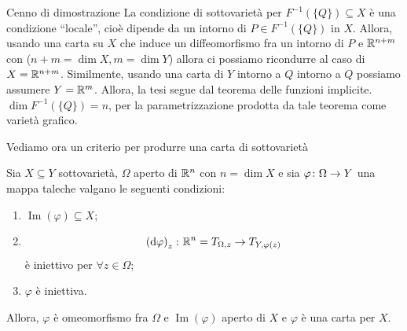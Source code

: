\documentclass[a4paper]{article}
\begin{document}
\begin{snippetproof}{Cenno di dimostrazione}
    La condizione di sottovarietà per \(F^{-1}(\{Q\}) \subseteq X\)
    è una condizione ``locale'', cioè dipende da un intorno di \(P \in F^{-1}(\{Q\})\)
    in \(X\). Allora, usando una carta su \(X\) che induce un diffeomorfismo fra un intorno di
    \(P\) e \(\mathbb{R}^{n+m}\) con (\(n+m = \dim X, m = \dim Y\)) allora
    ci possiamo ricondurre al caso di \(X = \mathbb{R}^{n+m}\).
    Similmente, usando una carta di \(Y\) intorno a \(Q\)
    intorno a \(Q\) possiamo assumere \(Y = \mathbb{R}^m\). Allora,
    la tesi segue dal teorema delle funzioni implicite.
    \(\dim F^{-1}(\{Q\}) = n\), per la parametrizzazione prodotta da tale teorema come varietà grafico.
\end{snippetproof}

Vediamo ora un criterio per produrre una carta di sottovarietà

\begin{snippettheorem}{}
    Sia \(X \subseteq Y\) sottovarietà, \(\Omega\) aperto di \(\mathbb{R}^n\)
    con \(n = \dim X\)
    e sia \(\varphi \colon \Omega \to Y\)
    una mappa taleche valgano le seguenti condizioni:
    \begin{enumerate}
        \item \(\operatorname{Im}(\varphi) \subseteq X\);
        \item \[
            \left(\text{d}\varphi\right)_z \colon \mathbb{R}^n = T_{\Omega, z} \to T_{Y, \varphi(z)}
        \]
        è iniettivo per \(\forall z \in \Omega\);
        \item \(\varphi\) è iniettiva.
    \end{enumerate}
    Allora, \(\varphi\) è omeomorfismo fra \(\Omega\) e \(\operatorname{Im}(\varphi)\)
    aperto di \(X\) e \(\varphi\) è una carta per \(X\).
\end{snippettheorem}
\end{document}
